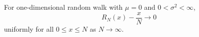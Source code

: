 For one-dimensional random walk with \(\mu = 0\) and \(0 < \sigma^2 < \infty\),
\[
R_N(x) - \frac{x}{N} \to 0
\]
uniformly for all \(0 \leq x \leq N\) as \(N \to \infty\).
